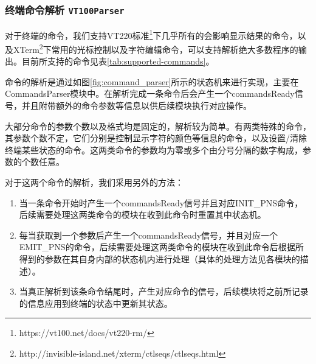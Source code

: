 \subsubsection[终端命令解析]{终端命令解析 \texttt{VT100Parser}}

对于终端的命令，我们支持VT220标准\footnote{https://vt100.net/docs/vt220-rm/}下几乎所有的会影响显示结果的命令，以及XTerm\footnote{http://invisible-island.net/xterm/ctlseqs/ctlseqs.html}下常用的光标控制以及字符编辑命令，可以支持解析绝大多数程序的输出。目前所支持的命令见表\ref{tab:supported-commands}。

命令的解析是通过如图\ref{fig:command_parser}所示的状态机来进行实现，主要在CommandsParser模块中。在解析完成一条命令后会产生一个commandsReady信号，并且附带额外的命令参数等信息以供后续模块执行对应操作。

大部分命令的参数个数以及格式均是固定的，解析较为简单。有两类特殊的命令，其参数个数不定，它们分别是控制显示字符的颜色等信息的命令，以及设置/清除终端某些状态的命令。这两类命令的参数均为零或多个由分号分隔的数字构成，参数的个数任意。

对于这两个命令的解析，我们采用另外的方法：

\begin{enumerate}
	\item 当一条命令开始时产生一个commandsReady信号并且对应INIT\_PNS命令，后续需要处理这两类命令的模块在收到此命令时重置其中状态机。
	\item 每当获取到一个参数后产生一个commandsReady信号，并且对应一个EMIT\_PNS的命令，后续需要处理这两类命令的模块在收到此命令后根据所得到的参数在其自身内部的状态机内进行处理（具体的处理方法见各模块的描述）。
	\item 当真正解析到该条命令结尾时，产生对应命令的信号，后续模块将之前所记录的信息应用到终端的状态中更新其状态。
\end{enumerate}

